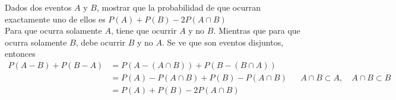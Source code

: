 \item Dados dos eventos $A$ y $B$, mostrar que la probabilidad de que ocurran exactamente uno de ellos es $P(A)+P(B)-2P(A\cap B)$\e\\
    Para que ocurra solamente $A$, tiene que ocurrir $A$ y no $B$. Mientras que para que ocurra solamente $B$, debe ocurrir $B$ y no $A$. Se ve que son eventos disjuntos, entonces
    \begin{align*}
        P(A-B)+P(B-A)&=P(A-(A\cap B))+P(B-(B\cap A))\\
        &=P(A)-P(A\cap B)+P(B)-P(A\cap B)&&A\cap B\subset A,\quad A\cap B\subset B\\
        &=P(A)+P(B)-2P(A\cap B)
    \end{align*}